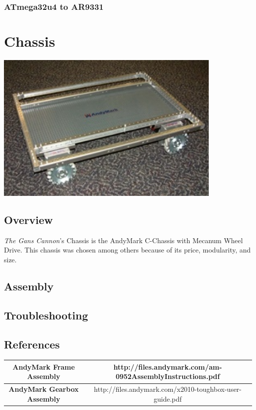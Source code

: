 \documentclass[letterpaper,12pt]{article}
\newcommand{\botname}{\textit{The Gans Cannon}}
\begin{document}
\subsubsection{ATmega32u4 to AR9331}
\label{sec:mega_ath_msg}



\section{Chassis}
\begin{center}
    \includegraphics[width=11cm]{pics/chassis/andymark_chassis.jpg}
\end{center}

\subsection{Overview}
\botname's Chassis is the AndyMark C-Chassis with Mecanum Wheel Drive. This chassis was chosen among others because of its price, modularity, and size.

\subsection{Assembly}
\subsection{Troubleshooting}
\subsection{References}

\begin{table}[h!]
  \begin{tabular}{| c | c |}
    \hline
    \textbf{AndyMark Frame Assembly} &  http://files.andymark.com/am-0952AssemblyInstructions.pdf\\
    \hline
    \textbf{AndyMark Gearbox Assembly} &  http://files.andymark.com/x2010-toughbox-user-guide.pdf\\
    \hline
  \end{tabular}
  \label{tab:fire_cmd_msg}
\end{table}
\end{document}

